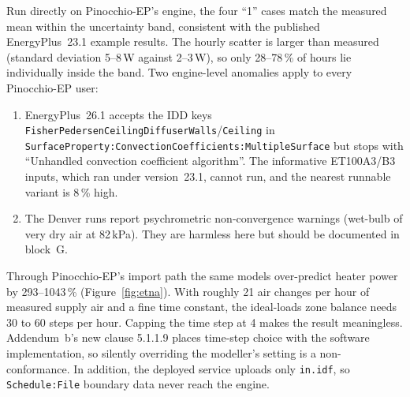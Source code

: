 \documentclass[10pt,a4paper]{article}
\newcommand{\code}[1]{\texttt{\small #1}}
\begin{document}
Run directly on Pinocchio-EP's engine, the four ``1'' cases match the measured mean within the uncertainty band,
consistent with the published EnergyPlus~23.1 example results. The hourly scatter is larger than measured (standard
deviation 5--8\,W against 2--3\,W), so only 28--78\,\% of hours lie individually inside the band. Two engine-level
anomalies apply to every Pinocchio-EP user:
\begin{enumerate}[label=(\alph*)]
\item EnergyPlus~26.1 accepts the IDD keys \code{FisherPedersenCeilingDiffuserWalls}/\code{Ceiling} in
\code{SurfaceProperty:ConvectionCoefficients:MultipleSurface} but stops with ``Unhandled convection coefficient
algorithm''. The informative ET100A3/B3 inputs, which ran under version~23.1, cannot run, and the nearest runnable
variant is 8\,\% high.
\item The Denver runs report psychrometric non-convergence warnings (wet-bulb of very dry air at 82\,kPa). They
are harmless here but should be documented in block~G.
\end{enumerate}
Through Pinocchio-EP's import path the same models over-predict heater power by 293--1043\,\%
(Figure~\ref{fig:etna}). With roughly 21 air changes per hour of measured supply air and a fine time constant, the
ideal-loads zone balance needs 30 to 60 steps per hour. Capping the time step at 4 makes the result meaningless.
Addendum~b's new clause 5.1.1.9 places time-step choice with the software implementation, so silently overriding
the modeller's setting is a non-conformance. In addition, the deployed service uploads only \code{in.idf}, so
\code{Schedule:File} boundary data never reach the engine.
\end{document}

